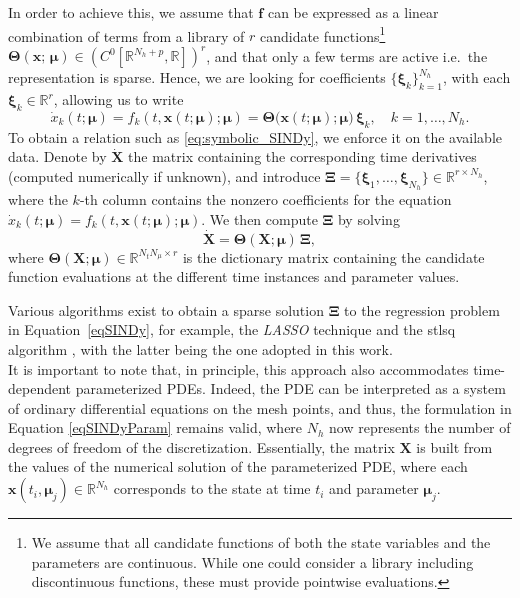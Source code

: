 \documentclass[reqno]{amsart}[standalone]
\theoremstyle{definition}
\theoremstyle{remark}
\newcommand{\R}{\mathbb{R}}
\newcommand{\bs}{\boldsymbol}
\begin{document}
In order to achieve this, we assume that $\bs{f}$ can be expressed as a linear combination of terms from a library of $r$ candidate functions\footnote{We assume that all candidate functions of both the state variables and the parameters are continuous. While one could consider a library including discontinuous functions, these must provide pointwise evaluations.}
%
$\bs{\Theta}(\bs{x};\,\bs{\mu})\in(C^0[\R^{N_h+p},\R])^r$, and that only a few terms are active i.e.\ the representation is sparse. Hence, we are looking for coefficients $\{\bs{\xi}_k\}_{k=1}^{N_h}$, with each $\bs{\xi}_k\in\R^r$, allowing us to write
\begin{equation}\label{eq:symbolic_SINDy}
    \dot{x}_k(t;\bs{\mu}) = f_k(t, \bs{x}(t;\bs{\mu});\bs{\mu}) = \bs{\Theta}\bigl(\bs{x}(t;\bs{\mu});\bs{\mu}\bigr)\,\bs{\xi}_k, \quad k = 1, \dots, N_h.
\end{equation}
To obtain a relation such as \eqref{eq:symbolic_SINDy}, we enforce it on the available data.
Denote by $\dot{\bs{X}}$ the matrix containing the corresponding time derivatives (computed numerically if unknown), and introduce $\bs{\Xi} = \{\bs{\xi}_1, \dots, \bs{\xi}_{N_h}\}\in\R^{r\times N_h}$, where the $k$-th column contains the nonzero coefficients for the equation $\dot{x}_k(t;\bs{\mu}) = f_k(t, \bs{x}(t;\bs{\mu});\bs{\mu})$.
We then compute $\bs{\Xi}$ by solving
\begin{equation}\label{eqSINDy}
    \dot{\bs{X}} = \bs{\Theta}(\bs{X}; \bs{\mu})\,\bs{\Xi},
\end{equation}
where $\bs{\Theta}(\bs{X};\bs{\mu})\in\R^{N_t
N_\mu\times r}$ is the dictionary matrix containing the candidate function evaluations at the different time instances and parameter values.

Various algorithms exist to obtain a sparse solution $\bs{\Xi}$ to the regression problem in Equation~\eqref{eqSINDy}, for example, the \emph{LASSO} technique \parencite{James_2013} and the \gls{stlsq} algorithm \parencite{Brunton_2016}, with the latter being the one adopted in this work.\\
It is important to note that, in principle, this approach also accommodates time-dependent parameterized PDEs. Indeed, the PDE can be interpreted as a system of ordinary differential equations on the mesh points, and thus, the formulation in Equation \eqref{eqSINDyParam} remains valid, where $N_h$ now represents the number of degrees of freedom of the discretization. Essentially, the matrix $\bs{X}$ is built from the values of the numerical solution of the parameterized PDE, where each $\bs{x}(t_i,\bs{\mu}_j)\in\R^{N_h}$ corresponds to the state at time $t_i$ and parameter $\bs{\mu}_j$.
\end{document}
